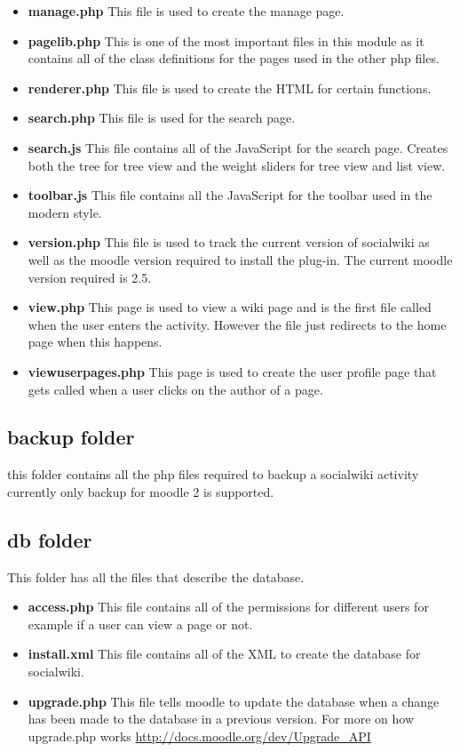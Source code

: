 \documentclass[letterpaper,twoside,11pt]{article}
\begin{document}
\begin{itemize}
	\item \textbf{manage.php}
	This file is used to create the manage page.
	\item \textbf{pagelib.php}
	This is one of the most important files in this module as it contains all of the class definitions for the pages used in the other php files.
	\item \textbf{renderer.php}	
	This file is used to create the HTML for certain functions.
	\item \textbf{search.php}
	This file is used for the search page.
	\item \textbf{search.js}
	This file contains all of the JavaScript for the search page. Creates both the tree for tree view and the weight sliders for tree view and list view.
	\item \textbf{toolbar.js}
	This file contains all the JavaScript for the toolbar used in the modern style.
	\item \textbf{version.php}
	This file is used to track the current version of socialwiki as well as the moodle version required to install the plug-in. The current moodle version required is 2.5.
	\item \textbf{view.php}
	This page is used to view a wiki page and is the first file called when the user enters the activity. However the file just redirects to the home page when this happens.
	\item \textbf{viewuserpages.php}
	This page is used to create the user profile page that gets called when a user clicks on the author of a page.
\end{itemize}	
	\subsection{backup folder}
	this folder contains all the php files required to backup a socialwiki activity
	currently only backup for moodle 2 is supported.
	\subsection{db folder}
	This folder has all the files that describe the database.
\begin{itemize}	
\item \textbf{access.php}
	This file contains all of the permissions for different users for example if a user can view a page or not.
	\item \textbf{install.xml}
	This file contains all of the XML to create the database for socialwiki.
	\item \textbf{upgrade.php}
	This file tells moodle to update the database when a change has been made to the database in a previous version. For more on how upgrade.php works \url{http://docs.moodle.org/dev/Upgrade_API} 
\end{itemize}
\end{document}
